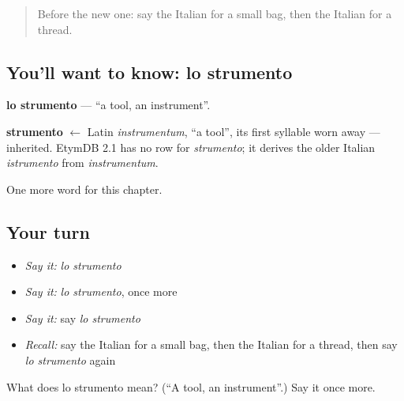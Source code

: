 \label{lesson:IT-C257-strumento}



\begin{quote}
Before the new one: say the Italian for a small bag, then the Italian for a thread.
\end{quote}

\subsection*{You'll want to know: lo strumento}
\textbf{lo strumento} — \textquotedblleft{}a tool, an instrument\textquotedblright{}.

\begin{cousinweb}
\textbf{strumento} $\leftarrow$ Latin \emph{instrumentum}, \textquotedblleft{}a tool\textquotedblright{}, its first syllable worn away — inherited. EtymDB 2.1 has no row for \emph{strumento}; it derives the older Italian \emph{istrumento} from \emph{instrumentum}.
\end{cousinweb}

\begin{grammarlens}[title={What you've built}]
One more word for this chapter.
\end{grammarlens}

\subsection*{Your turn}
\begin{itemize}
\raggedright
  \item \emph{Say it:} \emph{lo strumento}
  \item \emph{Say it:} \emph{lo strumento}, once more
  \item \emph{Say it:} say \emph{lo strumento}
  \item \emph{Recall:} say the Italian for a small bag, then the Italian for a thread, then say \emph{lo strumento} again
\end{itemize}

\begin{tcolorbox}[breakable,colback=teal!4,colframe=teal!35!black,title={Before you move on}]
What does lo strumento mean? (\textquotedblleft{}A tool, an instrument\textquotedblright{}.) Say it once more.
\end{tcolorbox}
